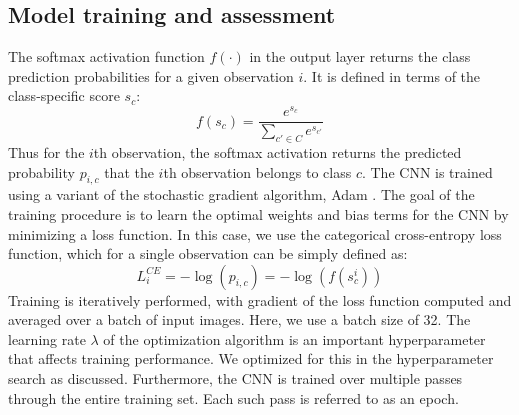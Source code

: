 \documentclass[Journal,letterpaper, SingleSpace, InsideFigs]{ascelike-new}
\begin{document}
\subsection{Model training and assessment}
The softmax activation function  $f(\cdot)$ in the output layer returns the class prediction probabilities for a given observation $i$. It is defined in terms of the class-specific score $s_c$:
\begin{equation}
    f(s_c) = \frac{e^{s_c}}{\sum\limits_{c' \in C} e^{s_{c'}}}
\end{equation}
Thus for the $i$th observation, the softmax activation returns the predicted probability $p_{i,c}$ that the $i$th observation belongs to class $c$.
The CNN is trained using a variant of the stochastic gradient algorithm, Adam \cite{kingma2017adam}.
The goal of the training procedure is to learn the optimal weights and bias terms for the CNN by minimizing a loss function. 
In this case, we use the categorical cross-entropy loss function, which for a single observation can be simply defined as:
\begin{equation}
    L_{i}^{CE} = -  \log( p_{i,c}) = - \log(f(s_c^i))
\end{equation}
Training is iteratively performed, with gradient of the loss function computed and averaged over a batch of input images.
Here, we use a batch size of 32.
The learning rate $\lambda$ of the optimization algorithm is an important hyperparameter that affects training performance.
We optimized for this in the hyperparameter search as discussed.
Furthermore, the CNN is trained over multiple passes through the entire training set.
Each such pass is referred to as an epoch.
\end{document}

